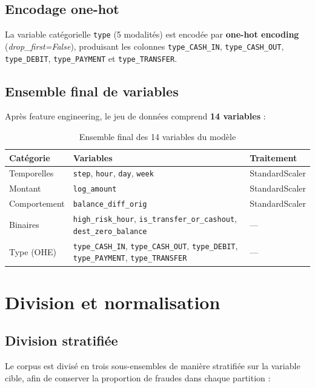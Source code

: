 \documentclass[12pt,a4paper,twoside]{report}
\begin{document}
\subsection{Encodage one-hot}

La variable catégorielle \texttt{type} (5 modalités) est encodée par \textbf{one-hot encoding} (\textit{drop\_first=False}), produisant les colonnes \texttt{type\_CASH\_IN}, \texttt{type\_CASH\_OUT}, \texttt{type\_DEBIT}, \texttt{type\_PAYMENT} et \texttt{type\_TRANSFER}.

\subsection{Ensemble final de variables}

Après feature engineering, le jeu de données comprend \textbf{14 variables} :

\begin{table}[H]
\centering
\caption{Ensemble final des 14 variables du modèle}
\label{tab:final_features}
\begin{tabular}{lll}
\toprule
\textbf{Catégorie} & \textbf{Variables} & \textbf{Traitement} \\
\midrule
Temporelles  & \texttt{step}, \texttt{hour}, \texttt{day}, \texttt{week} & StandardScaler \\
Montant      & \texttt{log\_amount} & StandardScaler \\
Comportement & \texttt{balance\_diff\_orig} & StandardScaler \\
Binaires     & \texttt{high\_risk\_hour}, \texttt{is\_transfer\_or\_cashout}, \texttt{dest\_zero\_balance} & --- \\
Type (OHE)   & \texttt{type\_CASH\_IN}, \texttt{type\_CASH\_OUT}, \texttt{type\_DEBIT}, \texttt{type\_PAYMENT}, \texttt{type\_TRANSFER} & --- \\
\bottomrule
\end{tabular}
\end{table}

\section{Division et normalisation}

\subsection{Division stratifiée}

Le corpus est divisé en trois sous-ensembles de manière stratifiée sur la variable cible, afin de conserver la proportion de fraudes dans chaque partition :
\end{document}
